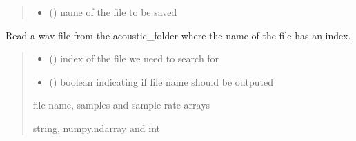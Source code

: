 \documentclass[letterpaper,10pt,english]{sphinxmanual}
\begin{document}
\begin{fulllineitems}
\begin{fulllineitems}
\begin{quote}
\begin{description}
\begin{itemize}
\item {} 
\sphinxAtStartPar
{} () \textendash{} name of the file to be saved

\end{itemize}

\end{description}\end{quote}

\end{fulllineitems}


\begin{fulllineitems}
\label{\detokenize{BeeClassification:BeeClassification.BeeClassification.file_read}}
\pysigstartsignatures
{}
\pysigstopsignatures
\sphinxAtStartPar
Read a wav file from the acoustic\_folder where the name of the file has an index.
\begin{quote}\begin{description}
\begin{itemize}
\item {} 
\sphinxAtStartPar
{} () \textendash{} index of the file we need to search for

\item {} 
\sphinxAtStartPar
{} () \textendash{} boolean indicating if file name should be outputed

\end{itemize}

\sphinxAtStartPar
file name, samples and sample rate arrays

\sphinxAtStartPar
string, numpy.ndarray and int

\end{description}\end{quote}

\end{fulllineitems}


\end{fulllineitems}
\end{document}
